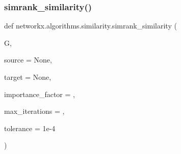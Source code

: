\subsubsection{\texorpdfstring{simrank\+\_\+similarity()}{simrank\_similarity()}}
{\footnotesize\ttfamily def networkx.\+algorithms.\+similarity.\+simrank\+\_\+similarity (\begin{DoxyParamCaption}\item[{}]{G,  }\item[{}]{source = {\ttfamily None},  }\item[{}]{target = {\ttfamily None},  }\item[{}]{importance\+\_\+factor = {},  }\item[{}]{max\+\_\+iterations = {},  }\item[{}]{tolerance = {\ttfamily 1e-\/4} }\end{DoxyParamCaption})}

